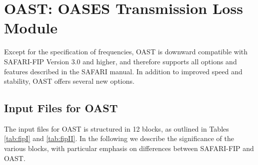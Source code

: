 \section{    OAST: OASES Transmission Loss Module}

    Except for the specification of frequencies, 
OAST  is downward compatible with SAFARI-FIP  Version 
3.0  and higher, and therefore supports all options and  features 
described in the SAFARI manual. In addition to improved speed and 
stability, OAST offers several new options.

\subsection{Input Files for OAST}

The input files for OAST is structured in 12 blocks, as outlined in
Tables\,\ref{tab:fipI} and \ref{tab:fipII}. In the following we
describe the significance of the various blocks, with particular
emphasis on differences between SAFARI-FIP and OAST. 

